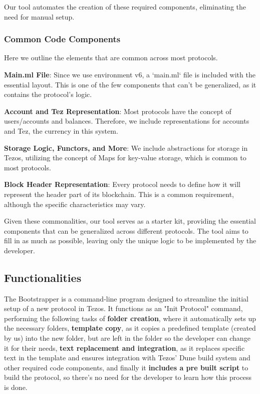 Our tool automates the creation of these required components, eliminating the need for manual setup.

\subsubsection*{Common Code Components}

Here we outline the elements that are common across most protocols.

\textbf{Main.ml File}: Since we use environment v6, a `main.ml` file is included with the essential layout. This is one of the few components that can't be generalized, as it contains the protocol's logic.
  
\textbf{Account and Tez Representation}: Most protocols have the concept of users/accounts and balances. Therefore, we include representations for accounts and Tez, the currency in this system.

\textbf{Storage Logic, Functors, and More}: We include abstractions for storage in Tezos, utilizing the concept of Maps for key-value storage, which is common to most protocols.

\textbf{Block Header Representation}: Every protocol needs to define how it will represent the header part of its blockchain. This is a common requirement, although the specific characteristics may vary.

Given these commonalities, our tool serves as a starter kit, providing the essential components that can be generalized across different protocols. The tool aims to fill in as much as possible, leaving only the unique logic to be implemented by the developer.


\subsection*{Functionalities}
The Bootstrapper is a command-line program designed to streamline the initial setup of a new protocol in Tezos.
It functions as an "Init Protocol" command, performing the following tasks of \textbf{folder creation}, where it automatically sets up the necessary folders, \textbf{template copy}, as it copies a predefined template (created by us) into the new folder, but are left in the folder so the developer can change it for their needs, \textbf{text replacement and integration}, as it replaces specific text in the template and ensures integration with Tezos' Dune build system and other required code components, and finally it \textbf{includes a pre built script} to build the protocol, so there's no need for the developer to learn how this process is done.

